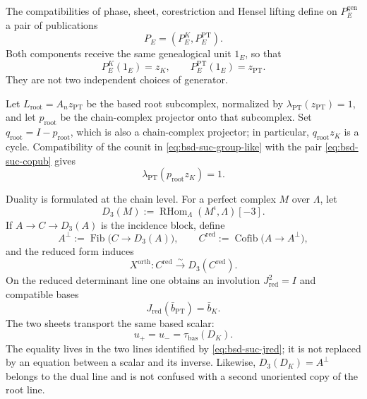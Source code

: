 The compatibilities of phase, sheet, corestriction and Hensel lifting
define on \(P_E^{\mathrm{gen}}\) a pair of publications
\begin{equation}\label{eq:bsd-suc-copub}
 P_E=(P_E^{K},P_E^{\mathrm{PT}}).
\end{equation}
Both components receive the same genealogical unit \(1_E\), so
that
\begin{equation}\label{eq:bsd-suc-zk-zpt}
 P_E^{K}(1_E)=z_K,
 \qquad P_E^{\mathrm{PT}}(1_E)=z_{\mathrm{PT}}.
\end{equation}
They are not two independent choices of generator.

Let \(L_{\mathrm{root}}=A_n z_{\mathrm{PT}}\) be the based root subcomplex,
normalized by
\(\lambda_{\mathrm{PT}}(z_{\mathrm{PT}})=1\), and let
\(p_{\mathrm{root}}\) be the chain-complex projector onto that subcomplex. Set
\(q_{\mathrm{root}}=I-p_{\mathrm{root}}\), which is also a chain-complex
projector; in particular, \(q_{\mathrm{root}}z_K\) is a cycle. Compatibility of the
counit in \eqref{eq:bsd-suc-group-like} with the pair
\eqref{eq:bsd-suc-copub} gives
\begin{equation}\label{eq:bsd-suc-normalizacion-raiz}
 \lambda_{\mathrm{PT}}(p_{\mathrm{root}}z_K)=1.
\end{equation}

Duality is formulated at the chain level. For a perfect complex
\(M\) over \(\Lambda\), let
\begin{equation}\label{eq:bsd-suc-d3}
 D_3(M):=
 \operatorname{RHom}_{\Lambda}(M^{\iota},\Lambda)[-3].
\end{equation}
If \(A\to C\to D_3(A)\) is the incidence block, define
\begin{equation}\label{eq:bsd-suc-orth-red}
 A^{\perp}:=\operatorname{Fib}\bigl(C\to D_3(A)\bigr),
 \qquad
 C^{\mathrm{red}}:=\operatorname{Cofib}\bigl(A\to A^{\perp}\bigr),
\end{equation}
and the reduced form induces
\begin{equation}\label{eq:bsd-suc-xorth}
 X^{\mathrm{orth}}:C^{\mathrm{red}}
 \xrightarrow{\ \sim\ }D_3(C^{\mathrm{red}}).
\end{equation}
On the reduced determinant line one obtains an involution
\(J_{\mathrm{red}}^2=I\) and compatible bases
\begin{equation}\label{eq:bsd-suc-jred}
 J_{\mathrm{red}}(\bar b_{\mathrm{PT}})=\bar b_K.
\end{equation}
The two sheets transport the same based scalar:
\begin{equation}\label{eq:bsd-suc-doble-hoja}
 u_{+}=u_{-}=\tau_{\mathrm{bas}}(D_K).
\end{equation}
The equality lives in the two lines identified by
\eqref{eq:bsd-suc-jred}; it is not replaced by an equation between a scalar and
its inverse. Likewise, \(D_3(D_K)=A^{\perp}\) belongs to the dual line and is not
confused with a second unoriented copy of the root line.

